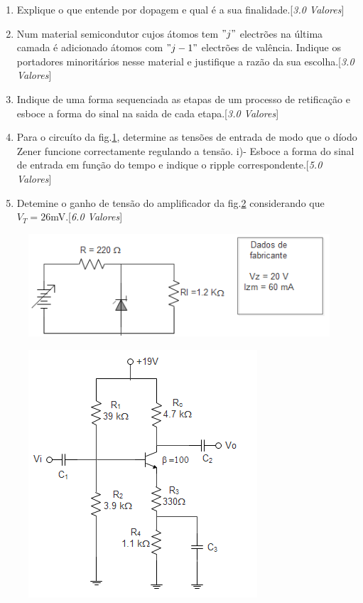 \documentclass[11pt,a4paper,twoside]{report}
\begin{document}
\begin{enumerate}
\item Explique o que entende por dopagem e qual \'e a sua finalidade.[\textit{{3.0 Valores}}]
\item Num material semicondutor cujos \'atomos tem $"j"$ electr\~oes na \'ultima camada \'e adicionado \'atomos com $"j-1"$ electr\~oes de val\^encia. Indique os portadores minorit\'arios nesse material e justifique a raz\~ao da sua escolha.[\textit{{3.0 Valores}}] 
\item Indique de uma forma sequenciada as etapas de um processo de retifica\c c\~ao e esboce a forma do sinal na saida de cada etapa.[\textit{{3.0 Valores}}]  
\item Para o circu\'ito da fig.\ref{f1}, determine as tensões de entrada  de modo que o díodo Zener funcione correctamente regulando a tens\~ao. i)- Esboce a forma do sinal de entrada  em fun\c c\~ao do tempo e indique o ripple correspondente.[\textit{{5.0 Valores}}]
\item Detemine o ganho de tens\~ao do amplificador da fig.\ref{f2} considerando que $V_T=26$mV.[\textit{{6.0 Valores}}]
\end{enumerate}
 \noindent
\begin{minipage}[c]{4cm}
 \begin{figure}[H]
\centering
\includegraphics[scale=0.8]{cZener}
\caption{}
\label{f1}
\end{figure}
\end{minipage}\hfill
\begin{minipage}[c]{7cm}
\begin{figure}[H]
\centering
\includegraphics[scale=0.87]{test2tbj}
\caption{}
\label{f2}
\end{figure}
\end{minipage}
\end{document}
